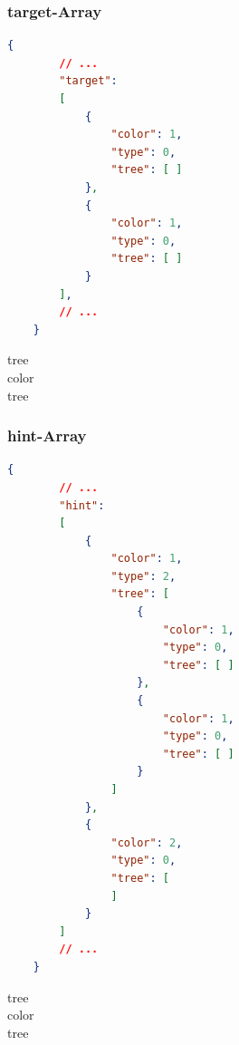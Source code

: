 \documentclass[11pt,a4paper]{report}
\begin{document}
\begin{minipage}{1\textwidth}

\subsubsection{target-Array}

\begin{lstlisting}[language=json,firstnumber=1] 
	{	
		// ...
		"target": 
		[
            {
                "color": 1,
                "type": 0,
                "tree": [ ]
            },
            {
                "color": 1,
                "type": 0,
                "tree": [ ]
            }
        ],
		// ...
	}
\end{lstlisting}

\begin{description}
	\item[tree]
	\item[color]
	\item[tree]
\end{description}

\end{minipage}


\begin{minipage}{1\textwidth}

\subsubsection{hint-Array}

\begin{lstlisting}[language=json,firstnumber=1] 
	{	
		// ...
		"hint": 
		[
            {
                "color": 1,
                "type": 2,
                "tree": [
                    {
                        "color": 1,
                        "type": 0,
                        "tree": [ ]
                    },
                    {
                        "color": 1,
                        "type": 0,
                        "tree": [ ]
                    }
                ]
            },
            {
                "color": 2,
                "type": 0,
                "tree": [
                ]
            }
        ]
		// ...
	}
\end{lstlisting}


\begin{description}
	\item[tree]
	\item[color]
	\item[tree]
\end{description}

\end{minipage}
\end{document}
